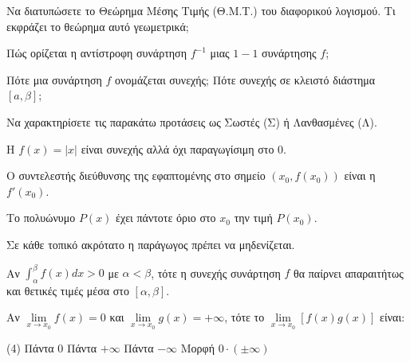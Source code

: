 \documentclass[11pt,a4paper]{article}
\newcommand{\kerkissans}[1]{{\fontfamily{maksf}\selectfont \textbf{#1}}}
\renewcommand{\textdexiakeraia}{}
\newcommand{\dint}{\displaystyle\int}
\newcommand\themanum{A}
\newcounter{thema}[section]
\renewcommand{\thethema}{\arabic{thema}}
\newcommand{\Thema}{\refstepcounter{thema}{\textbf{\textcolor{black}{\faPenSquare\ \  \large \kerkissans{\textbf{\thethemaο\hspace{2mm}Διαγώνισμα - Θέμα \themanum}}}}}\hspace{0mm}}{}
\newenvironment{thema}[1]
{\begin{tcolorbox}[title=\Thema\kerkissans{\textbf{\large{  #1}}},breakable,
enhanced standard,titlerule=0pt,toprule=0pt, rightrule=0pt, bottomrule=0pt,
colback=white,left=0mm,top=1mm,bottom=0mm,
boxrule=0pt,
colframe=white,leftrule=0mm,sharp corners,coltitle=black]
\renewcommand{\themanum}{#1}}
{\end{tcolorbox}}
\begin{document}
\begin{thema}{A}
\begin{erwthma}
    \item Να διατυπώσετε το Θεώρημα Μέσης Τιμής (Θ.Μ.Τ.) του διαφορικού λογισμού. Τι εκφράζει το θεώρημα αυτό γεωμετρικά;
    \item Πώς ορίζεται η αντίστροφη συνάρτηση $f^{-1}$ μιας $1-1$ συνάρτησης $f$;
    \item Πότε μια συνάρτηση $f$ ονομάζεται συνεχής; Πότε συνεχής σε κλειστό διάστημα $[a, \beta]$;
    \item Να χαρακτηρίσετε τις παρακάτω προτάσεις ως Σωστές (Σ) ή Λανθασμένες (Λ).
    \begin{alist}
        \item H $f(x)=|x|$ είναι συνεχής αλλά όχι παραγωγίσιμη στο 0.
        \item Ο συντελεστής διεύθυνσης της εφαπτομένης στο σημείο $(x_0, f(x_0))$ είναι η $f'(x_0)$.
        \item Το πολυώνυμο $P(x)$ έχει πάντοτε όριο στο $x_0$ την τιμή $P(x_0)$.
        \item Σε κάθε τοπικό ακρότατο η παράγωγος πρέπει να μηδενίζεται.
        \item Αν $\dint_{\alpha}^{\beta} f(x) dx > 0$ με $\alpha < \beta$, τότε η συνεχής συνάρτηση $f$ θα παίρνει απαραιτήτως και θετικές τιμές μέσα στο $[\alpha, \beta]$.
    \end{alist}
    \item Αν $\lim\limits_{x\to x_0} f(x) = 0$ και $\lim\limits_{x\to x_0} g(x) = +\infty$, τότε το $\lim\limits_{x\to x_0} [f(x)g(x)]$ είναι:
    \begin{tasks}[label=\let\textdexiakeraia\relax\alph*.](4)
        \task Πάντα $0$
        \task Πάντα $+\infty$
        \task Πάντα $-\infty$
        \task Μορφή $0 \cdot (\pm \infty)$
    \end{tasks}
\end{erwthma}
\end{thema}
\vspace{1cm}
\end{document}
